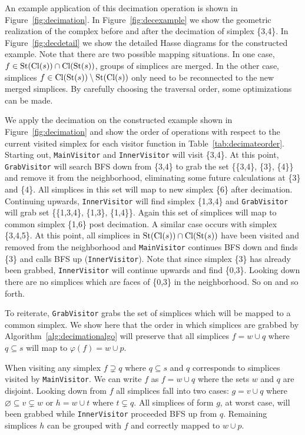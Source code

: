 		\par An example application of this decimation operation is shown in Figure~\ref{fig:decimation}.
		In Figure~\ref{fig:decexample} we show the geometric realization of the complex before and after the decimation of simplex \{3,4\}.
		In Figure~\ref{fig:decdetail} we show the detailed Hasse diagrams for the constructed example. Note that there are two possible mapping situations.
		In one case, $f \in \operatorname{St}(\operatorname{Cl}(s)) \cap \operatorname{Cl}(\operatorname{St}(s))$, groups of simplices are merged.
		In the other case, simplices $f \in \operatorname{Cl}(\operatorname{St}(s)) \setminus \operatorname{St}(\operatorname{Cl}(s))$ only need to be reconnected to the new merged simplices.
		By carefully choosing the traversal order, some optimizations can be made.

		\par We apply the decimation on the constructed example shown in Figure~\ref{fig:decimation} and show the order of operations with respect to the current visited simplex for each visitor function in Table~\ref{tab:decimateorder}.
		Starting out, \verb|MainVisitor| and \verb|InnerVisitor| will visit \{3,4\}.
		At this point, \verb|GrabVisitor| will search BFS down from \{3,4\} to grab the set \{\{3,4\}, \{3\}, \{4\}\} and remove it from the neighborhood, eliminating some future calculations at \{3\} and \{4\}.
		All simplices in this set will map to new simplex \{6\} after decimation.
		Continuing upwards, \verb|InnerVisitor| will find simplex \{1,3,4\} and \verb|GrabVisitor| will grab set \{\{1,3,4\}, \{1,3\}, \{1,4\}\}.
		Again this set of simplices will map to common simplex \{1,6\} post decimation.
		A similar case occurs with simplex \{3,4,5\}. At this point, all simplices in $\operatorname{St}(\operatorname{Cl}(s)) \cap \operatorname{Cl}(\operatorname{St}(s))$ have been visited and removed from the neighborhood and \verb|MainVisitor| continues BFS down and finds \{3\} and calls BFS up (\verb|InnerVisitor|).
		Note that since simplex \{3\} has already been grabbed, \verb|InnerVisitor| will continue upwards and find \{0,3\}.
		Looking down there are no simplices which are faces of \{0,3\} in the neighborhood. So on and so forth.

		\par To reiterate, \verb|GrabVisitor| grabs the set of simplices which will be mapped to a common simplex.
		We show here that the order in which simplices are grabbed by Algorithm~\ref{alg:decimationalgo} will preserve that all simplices $f = w\cup q$ where $q\subseteq s$ will map to $\varphi(f) = w\cup p$.

		\par When visiting any simplex $f\supsetneq q$ where $q\subseteq s$ and $q$ corresponds to simplices visited by \texttt{MainVisitor}.
		We can write $f$ as $f = w\cup q$ where the sets $w$ and $q$ are disjoint.
		Looking down from $f$ all simplices fall into two cases: $g = v\cup q$ where $\varnothing \subseteq v\subsetneq w$ or $h = w\cup t$ where $t\subsetneq q$.
		All simplices of form $g$, at worst case, will been grabbed while \verb|InnerVisitor| proceeded BFS up from $q$.
		Remaining simplices $h$ can be grouped with $f$ and correctly mapped to $w\cup p$.

